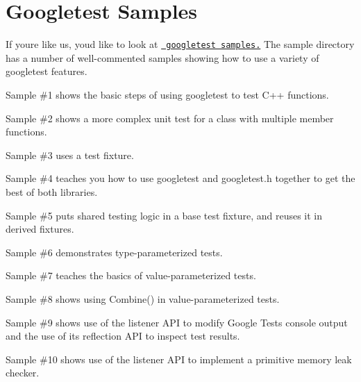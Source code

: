 \chapter{Googletest Samples}
\hypertarget{md_build_2__deps_2googletest-src_2docs_2samples}{}\label{md_build_2__deps_2googletest-src_2docs_2samples}
\label{md_build_2__deps_2googletest-src_2docs_2samples_autotoc_md376}%
%
 If you\textquotesingle{}re like us, you\textquotesingle{}d like to look at \href{https://github.com/google/googletest/tree/master/googletest/samples}{\texttt{ googletest samples.}} The sample directory has a number of well-\/commented samples showing how to use a variety of googletest features.


\begin{DoxyItemize}
\item Sample \#1 shows the basic steps of using googletest to test C++ functions.
\item Sample \#2 shows a more complex unit test for a class with multiple member functions.
\item Sample \#3 uses a test fixture.
\item Sample \#4 teaches you how to use googletest and {\ttfamily googletest.\+h} together to get the best of both libraries.
\item Sample \#5 puts shared testing logic in a base test fixture, and reuses it in derived fixtures.
\item Sample \#6 demonstrates type-\/parameterized tests.
\item Sample \#7 teaches the basics of value-\/parameterized tests.
\item Sample \#8 shows using {\ttfamily Combine()} in value-\/parameterized tests.
\item Sample \#9 shows use of the listener API to modify Google Test\textquotesingle{}s console output and the use of its reflection API to inspect test results.
\item Sample \#10 shows use of the listener API to implement a primitive memory leak checker. 
\end{DoxyItemize}